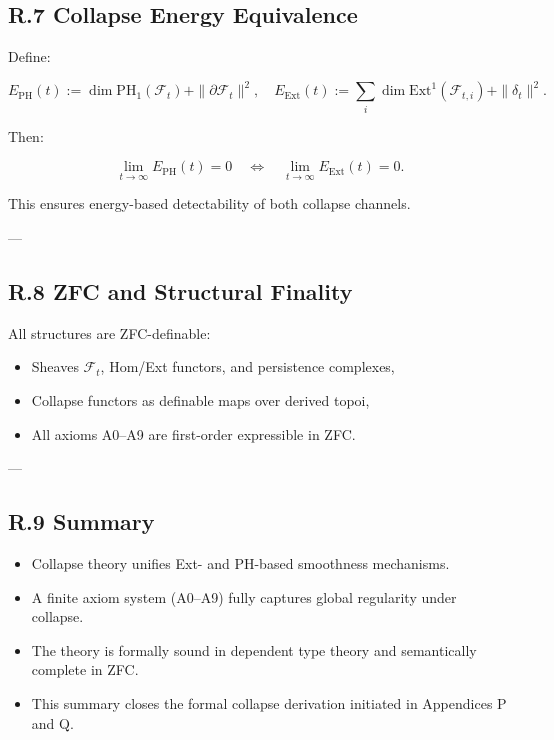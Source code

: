 \documentclass[11pt]{article}
\begin{document}
\subsection*{R.7 Collapse Energy Equivalence}

Define:

\[
E_{\mathrm{PH}}(t) := \dim \mathrm{PH}_1(\mathcal{F}_t) + \|\partial \mathcal{F}_t\|^2, \quad
E_{\mathrm{Ext}}(t) := \sum_i \dim \mathrm{Ext}^1(\mathcal{F}_{t,i}) + \|\delta_t\|^2.
\]

Then:

\[
\lim_{t \to \infty} E_{\mathrm{PH}}(t) = 0
\quad \Leftrightarrow \quad
\lim_{t \to \infty} E_{\mathrm{Ext}}(t) = 0.
\]

This ensures energy-based detectability of both collapse channels.

---

\subsection*{R.8 ZFC and Structural Finality}

All structures are ZFC-definable:
\begin{itemize}
  \item Sheaves $\mathcal{F}_t$, Hom/Ext functors, and persistence complexes,
  \item Collapse functors as definable maps over derived topoi,
  \item All axioms A0–A9 are first-order expressible in ZFC.
\end{itemize}

---

\subsection*{R.9 Summary}

\begin{itemize}
  \item Collapse theory unifies Ext- and PH-based smoothness mechanisms.
  \item A finite axiom system (A0–A9) fully captures global regularity under collapse.
  \item The theory is formally sound in dependent type theory and semantically complete in ZFC.
  \item This summary closes the formal collapse derivation initiated in Appendices P and Q.
\end{itemize}
\end{document}
